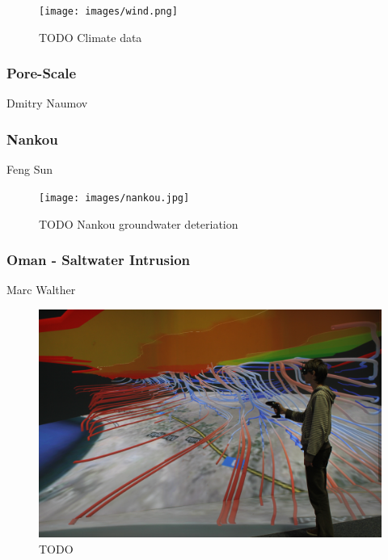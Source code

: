 \begin{figure}
  \texttt{[image: images/wind.png]}
\caption{TODO Climate data}
\label{fig:wind}
\end{figure}

\subsubsection{Pore-Scale}
\label{pore-scale}

Dmitry Naumov

\subsubsection{Nankou}
\label{nankou}

Feng Sun \cite{sun:ees}

\begin{figure}
  \texttt{[image: images/nankou.jpg]}
\caption{TODO Nankou groundwater deteriation}
\label{fig:nankou}
\end{figure}

\subsubsection{Oman - Saltwater Intrusion}
\label{oman---saltwater-intrusion}

Marc Walther

\begin{figure}
  \includegraphics[width=\linewidth]{images/oman.jpg}
\caption{TODO}
\label{fig:oman}
\end{figure}

